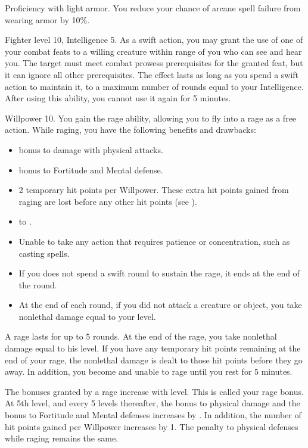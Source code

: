 \featpre Proficiency with light armor.
\featben You reduce your chance of arcane spell failure from wearing armor by 10\%.

\featpres Fighter level 10, Intelligence 5.
\featben As a swift action, you may grant the use of one of your combat feats to a willing creature within \rngmed range of you who can see and hear you.
The target must meet combat prowess prerequisites for the granted feat, but it can ignore all other prerequisites.
The effect lasts as long as you spend a swift action to maintain it, to a maximum number of rounds equal to your Intelligence.
After using this ability, you cannot use it again for 5 minutes.

\featpres Willpower 10.
\featben You gain the rage ability, allowing you to fly into a rage as a free action.
While raging, you have the following benefits and drawbacks:
\begin{itemize}
    \item {} bonus to damage with physical attacks.
    \item {} bonus to Fortitude and Mental defense.
    \item 2 temporary hit points per Willpower.
        These extra hit points gained from raging are lost before any other hit points (see ).
    \item {} to .
    \item Unable to take any action that requires patience or concentration, such as casting spells.
    \item If you does not spend a swift round to sustain the rage, it ends at the end of the round.
    \item At the end of each round, if you did not attack a creature or object, you take nonlethal damage equal to your level.
\end{itemize}

A rage lasts for up to 5 rounds.
At the end of the rage, you take nonlethal damage equal to his level.
If you have any temporary hit points remaining at the end of your rage, the nonlethal damage is dealt to those hit points before they go away.
In addition, you become \fatigued and unable to rage until you rest for 5 minutes.

The bonuses granted by a rage increase with level.
This is called your rage bonus.
At 5th level, and every 5 levels thereafter, the bonus to physical damage and the bonus to Fortitude and Mental defenses increases by .
In addition, the number of hit points gained per Willpower increases by 1.
The penalty to physical defenses while raging remains the same.


